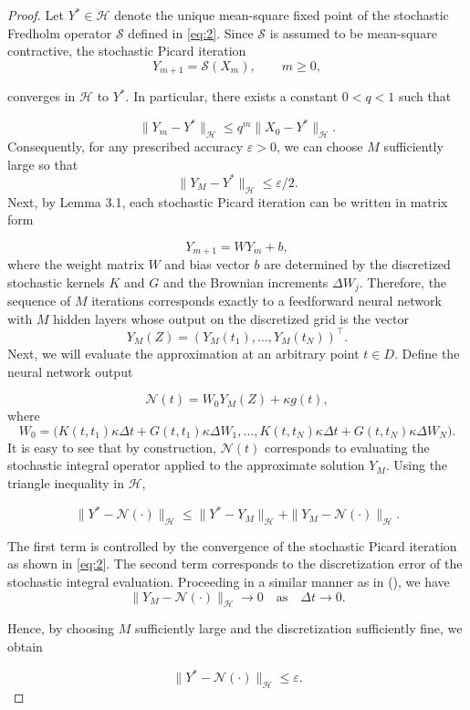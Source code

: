 \documentclass[preprint,12pt,authoryear]{elsarticle}
\begin{document}
\begin{proof}
Let $Y^\ast \in \mathcal H$ denote the unique mean-square fixed point of the stochastic Fredholm operator $\mathcal S$ defined in \eqref{eq:2}.
Since $\mathcal S$ is assumed to be mean-square contractive, the stochastic Picard iteration
\[
Y_{m+1} = \mathcal S(X_m), \qquad m \ge 0,
\]

converges in $\mathcal H$ to $Y^\ast$. In particular, there exists a constant $0<q<1$ such that

\begin{equation}
\|Y_m - Y^\ast\|_{\mathcal H}
\le
q^m \|X_0 - Y^\ast\|_{\mathcal H}.
\label{eq:2.16}
\end{equation}
Consequently, for any prescribed accuracy $\varepsilon>0$, we can choose $M$ sufficiently large so that
\begin{equation}
\|Y_M - Y^\ast\|_{\mathcal H} \le \varepsilon/2.
\label{eq:2.17}
\end{equation}
Next, by Lemma 3.1, each stochastic Picard iteration can be written in matrix form

\begin{equation}
Y_{m+1}=W Y_m + b,
\label{eq:2.18}
\end{equation}
where the weight matrix $W$ and bias vector $b$ are determined by the discretized stochastic kernels $K$ and $G$ and the Brownian increments $\Delta W_j$. Therefore, the sequence of $M$ iterations corresponds exactly to a feedforward neural network with $M$ hidden layers whose output on the discretized grid is the vector
\[
Y_M(Z)=(Y_M(t_1),\dots,Y_M(t_N))^\top.
\]
Next, we will evaluate the approximation at an arbitrary point $t\in D$.
Define the neural network output

\begin{equation}
	\mathcal N(t)
	=
	W_0 Y_M(Z) + \kappa g(t),
	\label{eq:2.19}
\end{equation}
where
\[
W_0 =
\big(
K(t,t_1)\kappa\Delta t + G(t,t_1)\kappa\Delta W_1,
\dots,
K(t,t_N)\kappa\Delta t + G(t,t_N)\kappa\Delta W_N
\big).
\]
It is easy to see that by construction, $\mathcal N(t)$ corresponds to evaluating the stochastic integral operator applied to the approximate solution $Y_M$.
Using the triangle inequality in $\mathcal H$,

\begin{equation}
\|Y^\ast - \mathcal N(\cdot)\|_{\mathcal H}
\le
\|Y^\ast - Y_M\|_{\mathcal H}
+
\|Y_M - \mathcal N(\cdot)\|_{\mathcal H}.
\label{eq:2.20}
\end{equation}

The first term is controlled by the convergence of the stochastic Picard iteration as shown in \eqref{eq:2}.  The second term corresponds to the discretization error of the stochastic integral evaluation. Proceeding in a similar manner as in (\cite{KloedenPlaten1992}), we have
\[
\|Y_M - \mathcal N(\cdot)\|_{\mathcal H} \to 0
\quad \text{as} \quad \Delta t \to 0.
\]

Hence, by choosing $M$ sufficiently large and the discretization sufficiently fine, we obtain

\[
\|Y^\ast - \mathcal N(\cdot)\|_{\mathcal H} \le \varepsilon.
\]
\end{proof}
\end{document}

